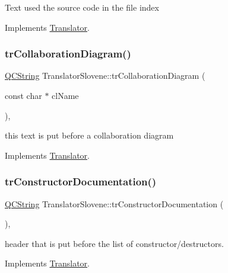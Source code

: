 Text used the source code in the file index 

Implements \mbox{\hyperlink{class_translator}{Translator}}.

\mbox{\label{class_translator_slovene_a741a97b0516f06bc2b2c0d3c10e8e2ba}} 
\subsubsection{\texorpdfstring{trCollaborationDiagram()}{trCollaborationDiagram()}}
{\footnotesize\ttfamily \mbox{\hyperlink{class_q_c_string}{Q\+C\+String}} Translator\+Slovene\+::tr\+Collaboration\+Diagram (\begin{DoxyParamCaption}\item[{const char $\ast$}]{cl\+Name }\end{DoxyParamCaption})\hspace{0.3cm}{\ttfamily [inline]}, {\ttfamily [virtual]}}

this text is put before a collaboration diagram 

Implements \mbox{\hyperlink{class_translator}{Translator}}.

\mbox{\label{class_translator_slovene_ad2bb490e77c2125cbfc1f92b3062bdb7}} 
\subsubsection{\texorpdfstring{trConstructorDocumentation()}{trConstructorDocumentation()}}
{\footnotesize\ttfamily \mbox{\hyperlink{class_q_c_string}{Q\+C\+String}} Translator\+Slovene\+::tr\+Constructor\+Documentation (\begin{DoxyParamCaption}{ }\end{DoxyParamCaption})\hspace{0.3cm}{\ttfamily [inline]}, {\ttfamily [virtual]}}

header that is put before the list of constructor/destructors. 

Implements \mbox{\hyperlink{class_translator}{Translator}}.

